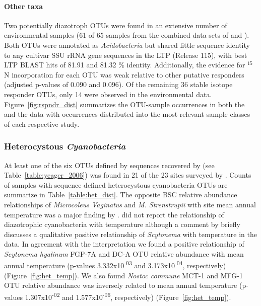 \paragraph{Other taxa} 
Two potentially diazotroph OTUs were found in an extensive number of
environmental samples (61 of 65 samples from the combined data sets of
\citet{Garcia_Pichel_2013} and \citet{Steven_2013}). Both OTUs were annotated
as \textit{Acidobacteria} but shared little sequence identity to any cultivar
SSU rRNA gene sequences in the LTP (Release 115), with best LTP BLAST hits of
81.91 and 81.32 \% identity. Additionally, the evidence for $^{15}$N incorporation for
each OTU was weak relative to other putative responders (adjusted p-values of
0.090 and 0.096). Of the remaining 36 stable isotope responder OTUs, only 14
were observed in the environmental data. Figure~\ref{fig:rspndr_dist}
summarizes the OTU-sample occurrences in both the \citet{Steven_2013} and the
\citet{Garcia_Pichel_2013} data with occurrences distributed into the most
relevant sample classes of each respective study.

\subsubsection{Heterocystous \textit{Cyanobacteria}} At least one of the six
OTUs defined by sequences recovered by \citet{Yeager} (see
Table~\ref{table:yeager_2006}) was found in 21 of the 23 sites surveyed by
\citet{Garcia_Pichel_2013}. Counts of samples with \citet{Yeager} sequence defined heterocystous cyanobacteria OTUs are summarize in Table~\ref{table:het_dist}. The opposite BSC relative abundance relationships
of \textit{Microcoleus Vaginatus} and \textit{M. Strenstrupii} with site mean
annual temperature was a major finding by \citet{Garcia_Pichel_2013}.
\citet{Garcia_Pichel_2013} did not report the relationship of diazotrophic
cyanobacteria with temperature although a comment by \citet{Belnap28062013}
briefly discusses a qualitative positive relationship of \textit{Scytonema}
with temperature in the \citet{Garcia_Pichel_2013} data. In agreement with the
\citet{Belnap28062013} interpretation we found a positive relationship of
\textit{Scytonema hyalinum} FGP-7A and DC-A OTU relative abundance with mean
annual temperature (p-values 3.332x10\textsuperscript{-03} and
3.173x10\textsuperscript{-04}, respectively) (Figure~\ref{fig:het_temp}). We
also found \textit{Nostoc commune} MCT-1 and MFG-1 OTU relative abundance was
inversely related to mean annual temperature (p-values
1.307x10\textsuperscript{-02} and 1.577x10\textsuperscript{-06}, respectively)
(Figure~\ref{fig:het_temp}). 

